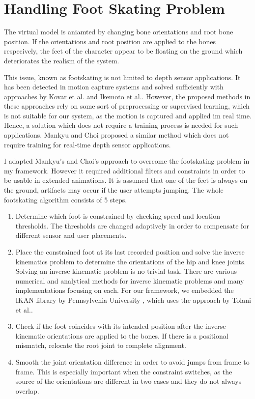 \section{Handling Foot Skating Problem}
\label{section2_5}
The virtual model is aniamted by changing bone orientations and root bone position. If the orientations and root position are applied to 
the bones respecively, the feet of the character appear to be floating on the ground which deteriorates the realism of the system. 

This issue, known as footskating is not limited to depth sensor applications. It has been detected in motion capture systems and solved sufficiently with approaches by 
Kovar et al.\cite{Kovar2002} and Ikemoto et al.\cite{Ikemoto2006}. However, the proposed methods in these approaches rely on some sort of preprocessing or supervised learning,
which is not suitable for our system, as the motion is captured and applied im real time. Hence, a solution which does not require a training process is needed for such applications. 
Mankyu and Choi \cite{Mankyu2013} proposed a similar method which does not require training for real-time depth sensor applications. 

I adapted Mankyu's and Choi's approach to overcome the footskating problem in my framework. However it required additional filters and constraints in order to be usable in extended 
animations. It is assumed that one of the feet is always on the ground, artifacts may occur if the user attempts jumping. The whole footskating algorithm consists of 5 steps. 

\begin{enumerate}
\item Determine which foot is constrained by checking speed and location thresholds. The thresholds are changed adaptively in order to compensate for different sensor and user placements.
\item Place the constrained foot at its last recorded position and solve the inverse kinematics problem to determine the orientations of the hip and knee joints. Solving an inverse kinematic
problem is no trivial task. There are various numerical and analytical methods for inverse kinematic problems and many implementations focusing on each. For our framework, we embedded 
the IKAN library by Pennsylvenia University \cite{IKAN2013}, which uses the approach by Tolani et al.\cite{Tolani2000}.  
\item Check if the foot coincides with its intended position after the inverse kinematic orientations are applied to the bones. If there is a positional mismatch, relocate the root joint to complete alignment.
\item Smooth the joint orientation difference in order to avoid jumps from frame to frame. This is especially important when the constraint switches, as the source of the orientations are different in two cases and they do not always overlap. 
\end{enumerate}

